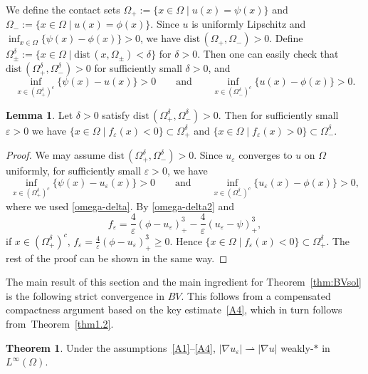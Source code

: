 \documentclass{amsart}
\theoremstyle{definition}
\newtheorem{theorem}[definition]{Theorem}
\newtheorem{lemma}[definition]{Lemma}
\newcommand{\dist}{\mathrm{dist}\,}
\begin{document}
We define the contact sets $\Omega _+ :=\{ x\in \Omega \mid u(x)=\psi (x) \}$ and
$\Omega _- :=\{ x\in \Omega \mid u(x)=\phi (x) \}$. Since $u$ is uniformly Lipschitz and $\inf_{x \in \Omega} \{\psi (x)-\phi (x)\}>0$,
we have $\dist (\Omega_+,\Omega_-)>0$.
Define $\Omega _\pm ^\delta := \{ x\in \Omega \mid \dist(x,\Omega_\pm) < \delta \}$ for $\delta>0$. Then one can easily check that
$\dist (\Omega_+ ^\delta, \Omega_- ^\delta)>0$
for sufficiently small $\delta>0$, and
\begin{equation}\label{omega-delta}
    \inf_{x \in (\Omega _+ ^\delta)^c} \{\psi (x) -u(x)\} >0
\qquad
\text{and}
\qquad
\inf_{x \in (\Omega _- ^\delta)^c} \{u (x) -\phi (x)\} >0.
\end{equation}
\begin{lemma}\label{lemma2.6}
Let $\delta>0$
satisfy $\dist (\Omega_+ ^\delta, \Omega_- ^\delta)>0$. 
Then for sufficiently small $\varepsilon>0$ we have
$\{ x \in \Omega \mid f_{\varepsilon} (x) <0 \} \subset \Omega_+ ^\delta$ and
$\{ x \in \Omega \mid f_{\varepsilon} (x) >0 \} \subset \Omega_- ^\delta$.
\end{lemma}
\begin{proof}
We may assume $\dist (\Omega_+ ^\delta, \Omega_- ^\delta)>0$. Since $u_\varepsilon$ converges to $u$ on $\Omega$ uniformly, for sufficiently small $\varepsilon>0$, we have
\begin{equation}\label{omega-delta2}
    \inf_{x \in (\Omega _+ ^\delta)^c} \{\psi (x) -u_\varepsilon(x)\} >0
\qquad
\text{and}
\qquad
\inf_{x \in (\Omega _- ^\delta)^c} \{u_\varepsilon (x) -\phi (x)\} >0,
\end{equation}
where we used \eqref{omega-delta}.
By \eqref{omega-delta2} and
\[
f_{\varepsilon} 
= \frac{4}{\varepsilon} (\phi-u_{\varepsilon})_+^3-\frac{4}{\varepsilon} (u_{\varepsilon}-\psi)_+^3,
\]
if $x \in (\Omega _+ ^\delta)^c $, 
$f_{\varepsilon} 
= \frac{4}{\varepsilon} (\phi-u_{\varepsilon})_+^3 \geq 0$.
Hence $\{ x \in \Omega \mid f_{\varepsilon} (x) <0 \} \subset \Omega_+ ^\delta$.
The rest of the proof can be shown in the same way.
\end{proof}

The main result of this section and the main ingredient for Theorem~\ref{thm:BVsol} is the following strict convergence in $BV$. This follows from a compensated compactness argument based on the key estimate~\eqref{A4}, which in turn follows from~Theorem~\ref{thm1.2}.
\begin{theorem}\label{thm:2.7}
Under the assumptions~\eqref{A1}--\eqref{A4}, $| \nabla u_\varepsilon | \rightharpoonup |\nabla u|$ weakly-$\ast$ in $L^\infty (\Omega )$.
\end{theorem}
\end{document}
